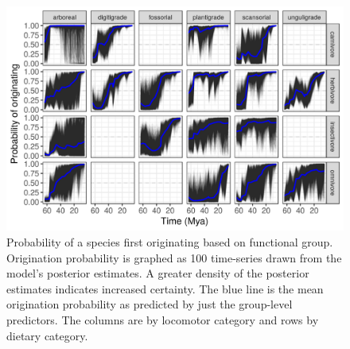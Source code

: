 \documentclass[12pt,letterpaper]{article}
\begin{document}
\begin{figure}[ht]
  \centering
  \includegraphics[width=\textwidth,height=0.4\textheight,keepaspectratio=true]{figure/ecotype_origin_bd}
  \caption{Probability of a species first originating based on functional group. Origination probability is graphed as 100 time-series drawn from the model's posterior estimates. A greater density of the posterior estimates indicates increased certainty. The blue line is the mean origination probability as predicted by just the group-level predictors. The columns are by locomotor category and rows by dietary category.}
  \label{fig:eco_origin}
\end{figure}
\end{document}
